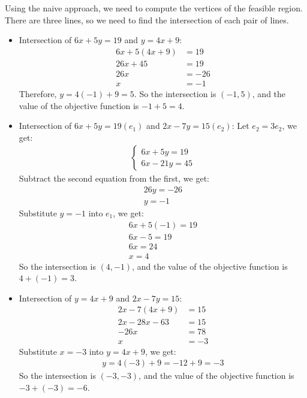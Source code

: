 \documentclass{article}
\begin{document}
Using the naive approach, we need to compute the vertices of the feasible region. There are three lines, so we need to find the intersection of each pair of lines.

\begin{itemize}
\item Intersection of $6x + 5y = 19$ and $y = 4x + 9$:
\begin{align*}
6x + 5(4x + 9) &= 19 \\
26x + 45 &= 19 \\
26x &= -26 \\
x &= -1
\end{align*}
Therefore, $y = 4(-1) + 9 = 5$. So the intersection is $(-1, 5)$, and the value of the objective function is $-1 + 5 = 4$.

\item Intersection of $6x + 5y = 19 (e_1)$ and $2x - 7y = 15 (e_2)$:
Let $e_2 = 3e_2$, we get:
\begin{align*}
\left\{\begin{array}{l}
6x + 5y = 19 \\
6x - 21y = 45
\end{array}\right.
\end{align*}
Subtract the second equation from the first, we get:
\begin{align*}
26y = -26 \\
y = -1
\end{align*}
Substitute $y = -1$ into $e_1$, we get:
\begin{align*}
6x + 5(-1) = 19 \\
6x - 5 = 19 \\
6x = 24 \\
x = 4
\end{align*}
So the intersection is $(4, -1)$, and the value of the objective function is $4 + (-1) = 3$.

\item Intersection of $y = 4x + 9$ and $2x - 7y = 15$:
\begin{align*}
2x - 7(4x + 9) &= 15 \\
2x - 28x - 63 &= 15 \\
-26x &= 78 \\
x &= -3
\end{align*}
Substitute $x = -3$ into $y = 4x + 9$, we get:
\begin{align*}
y = 4(-3) + 9 = -12 + 9 = -3
\end{align*}
So the intersection is $(-3, -3)$, and the value of the objective function is $-3 + (-3) = -6$.

\end{itemize}
\end{document}
